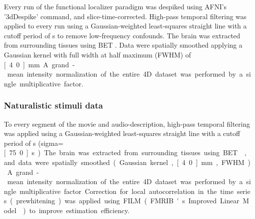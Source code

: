 
Every run of the functional localizer paradigm was despiked using AFNI's
\citep{cox1996afni, cox1997software} '3dDespike' command, and
slice-time-corrected.
High-pass temporal filtering was applied to every run using a Gaussian-weighted
least-squares straight line with a cutoff period of \unit[100]{s} to remove
low-frequency confounds.
The brain was extracted from surrounding tissues using BET \citep{smith2002bet}.
Data were spatially smoothed applying a Gaussian kernel with full width at half
maximum (FWHM) of \unit[4.0]{mm}
A grand-mean intensity normalization of the entire 4D dataset was performed by a
single multiplicative factor.

\subsubsection{Naturalistic stimuli data}




To every segment of the movie and audio-description, high-pass temporal
filtering was applied using a Gaussian-weighted least-squares straight line with
a cutoff period of \unit[150]{s} (sigma=\unit[75.0]{s}).
The brain was extracted from surrounding tissues using BET \citep{smith2002bet},
and data were spatially smoothed (Gaussian kernel, \unit[4.0]{mm}, FWHM).
A grand-mean intensity normalization of the entire 4D dataset was performed by a
single multiplicative factor.
Correction for local autocorrelation in the time series (prewhitening) was
applied using FILM (FMRIB's Improved Linear Model \citep{woolrich2001autocorr})
to improve estimation efficiency.

